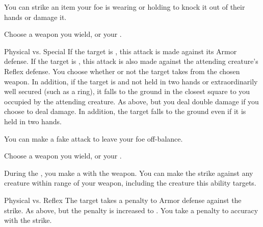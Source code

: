             \label{Disarm} You can strike an item your foe is wearing or holding to knock it out of their hands or damage it.
            \begin{ability}
                \begin{spelltargetinginfo}
                    \spellspecial Choose a weapon you wield, or your .
                \end{spelltargetinginfo}
                \begin{spelleffects}
                    \begin{spellattack}{Physical vs. Special}
                        \spellspecial If the target is , this attack is made against its Armor defense.
                        If the target is , this attack is also made against the attending creature's Reflex defense.
                        \spellsuccess You choose whether or not the target takes  from the chosen weapon.
                        In addition, if the target is  and not held in two hands or extraordinarily well secured (such as a ring), it falls to the ground in the closest square to you occupied by the attending creature.
                        \spellcritical As above, but you deal double damage if you choose to deal damage.
                        In addition, the target falls to the ground even if it is held in two hands.
                    \end{spellattack}
                \end{spelleffects}
            \end{ability}

            \label{Feint} You can make a fake attack to leave your foe off-balance.
            \begin{ability}
                \begin{spelltargetinginfo}
                    \spellspecial Choose a weapon you wield, or your .
                \end{spelltargetinginfo}
                \begin{spelleffects}
                    \spelleffect During the , you make a  with the weapon.
                    You can make the strike against any creature within range of your weapon, including the creature this ability targets.
                    \begin{spellattack}{Physical vs. Reflex}
                        \spellsuccess The target takes a  penalty to Armor defense against the strike.
                        \spellcritical As above, but the penalty is increased to .
                        \spellfailure You take a  penalty to accuracy with the strike.
                    \end{spellattack}
                \end{spelleffects}
            \end{ability}

